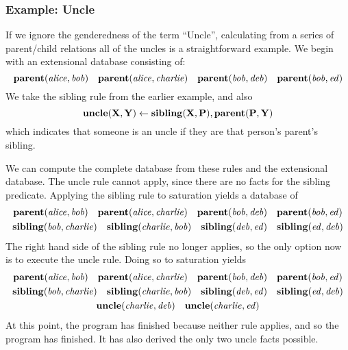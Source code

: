 \subsubsection{Example: Uncle}
If we ignore the genderedness of the term ``Uncle'', calculating from a series of parent/child relations all of the uncles is a straightforward example.
We begin with an extensional database consisting of:
\[
        {\bf parent}({\it alice}, {\it bob})
        \quad {\bf parent}({\it alice}, {\it charlie})
        \quad {\bf parent}({\it bob}, {\it deb})
        \quad {\bf parent}({\it bob}, {\it ed})
\]
We take the sibling rule from the earlier example, and also
\[
        {\bf uncle}({\bf X}, {\bf Y}) \leftarrow {\bf sibling}({\bf X}, {\bf P}), {\bf parent}({\bf P}, {\bf Y})
\]
which indicates that someone is an uncle if they are that person's parent's sibling.

We can compute the complete database from these rules and the extensional database.
The uncle rule cannot apply, since there are no facts for the sibling predicate.
Applying the sibling rule to saturation yields a database of
\begin{gather*}
        {\bf parent}({\it alice}, {\it bob})
        \quad {\bf parent}({\it alice}, {\it charlie})
        \quad {\bf parent}({\it bob}, {\it deb})
        \quad {\bf parent}({\it bob}, {\it ed})\\
        {\bf sibling}({\it bob}, {\it charlie})
        \quad {\bf sibling}({\it charlie}, {\it bob})
        \quad {\bf sibling}({\it deb}, {\it ed})
        \quad {\bf sibling}({\it ed}, {\it deb})
\end{gather*}
The right hand side of the sibling rule no longer applies, so the only option now is to execute the uncle rule.
Doing so to saturation yields
\begin{gather*}
        {\bf parent}({\it alice}, {\it bob})
        \quad {\bf parent}({\it alice}, {\it charlie})
        \quad {\bf parent}({\it bob}, {\it deb})
        \quad {\bf parent}({\it bob}, {\it ed})\\
        {\bf sibling}({\it bob}, {\it charlie})
        \quad {\bf sibling}({\it charlie}, {\it bob})
        \quad {\bf sibling}({\it deb}, {\it ed})
        \quad {\bf sibling}({\it ed}, {\it deb})\\
        {\bf uncle}({\it charlie}, {\it deb})
        \quad {\bf uncle}({\it charlie}, {\it ed})
\end{gather*}
At this point, the program has finished because neither rule applies, and so the program has finished.
It has also derived the only two uncle facts possible.

